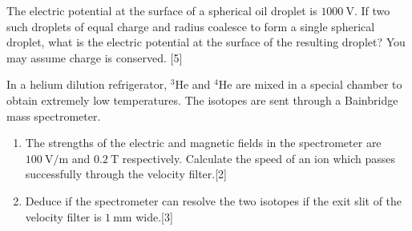 \begin{problem}
    \begin{subproblem}
        The electric potential at the surface of a spherical oil droplet is $\qty{1000}{\V}$. If two such droplets of equal charge and radius coalesce to form a single spherical droplet, what is the electric potential at the surface of the resulting droplet? You may assume charge is conserved.
    \hfill{[5]}\end{subproblem}
    \begin{subproblem}
        In a helium dilution refrigerator, ${}^{3}\mathrm{He}$ and ${}^{4}\mathrm{He}$ are mixed in a special chamber to obtain extremely low temperatures. The isotopes are sent through a Bainbridge mass spectrometer.
        \renewcommand{\theenumi}{(\alph{enumi})}
        \begin{enumerate}
            \item The strengths of the electric and magnetic fields in the spectrometer are $\qty{100}{\V\per\m}$ and $\qty{0.2}{\tesla}$ respectively. Calculate the speed of an ion which passes successfully through the velocity filter.\hfill{[2]}
            \item Deduce if the spectrometer can resolve the two isotopes if the exit slit of the velocity filter is $\qty{1}{\mm}$ wide.\hfill{[3]}
        \end{enumerate}
    \end{subproblem}
\end{problem}

